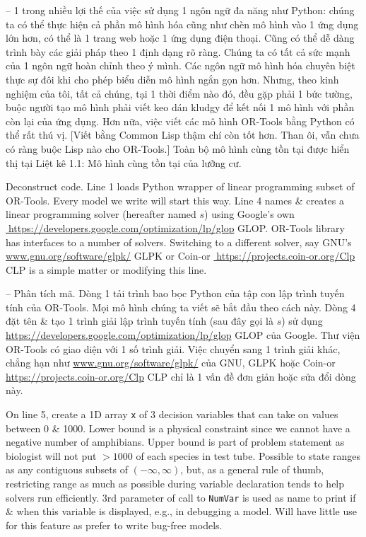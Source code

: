 \documentclass{article}
\begin{document}
\begin{itemize}
\begin{itemize}
        -- 1 trong nhiều lợi thế của việc sử dụng 1 ngôn ngữ đa năng như Python: chúng ta có thể thực hiện cả phần mô hình hóa cũng như chèn mô hình vào 1 ứng dụng lớn hơn, có thể là 1 trang web hoặc 1 ứng dụng điện thoại. Cũng có thể dễ dàng trình bày các giải pháp theo 1 định dạng rõ ràng. Chúng ta có tất cả sức mạnh của 1 ngôn ngữ hoàn chỉnh theo ý mình. Các ngôn ngữ mô hình hóa chuyên biệt thực sự đôi khi cho phép biểu diễn mô hình ngắn gọn hơn. Nhưng, theo kinh nghiệm của tôi, tất cả chúng, tại 1 thời điểm nào đó, đều gặp phải 1 bức tường, buộc người tạo mô hình phải viết keo dán kludgy để kết nối 1 mô hình với phần còn lại của ứng dụng. Hơn nữa, việc viết các mô hình OR-Tools bằng Python có thể rất thú vị. [Viết bằng Common Lisp thậm chí còn tốt hơn. Than ôi, vẫn chưa có ràng buộc Lisp nào cho OR-Tools.] Toàn bộ mô hình cùng tồn tại được hiển thị tại {\sf Liệt kê 1.1: Mô hình cùng tồn tại của lưỡng cư}.

        Deconstruct code. Line 1 loads Python wrapper of linear programming subset of OR-Tools. Every model we write will start this way. Line 4 names \& creates a linear programming solver (hereafter named $s$) using Google's own \url{https://developers.google.com/optimization/lp/glop} GLOP. OR-Tools library has interfaces to a number of solvers. Switching to a different solver, say GNU's \url{www.gnu.org/software/glpk/} GLPK or Coin-or \url{https://projects.coin-or.org/Clp} CLP is a simple matter or modifying this line.

        -- Phân tích mã. Dòng 1 tải trình bao bọc Python của tập con lập trình tuyến tính của OR-Tools. Mọi mô hình chúng ta viết sẽ bắt đầu theo cách này. Dòng 4 đặt tên \& tạo 1 trình giải lập trình tuyến tính (sau đây gọi là $s$) sử dụng \url{ https://developers.google.com/optimization/lp/glop} GLOP của Google. Thư viện OR-Tools có giao diện với 1 số trình giải. Việc chuyển sang 1 trình giải khác, chẳng hạn như \url{www.gnu.org/software/glpk/} của GNU, GLPK hoặc Coin-or \url{ https://projects.coin-or.org/Clp} CLP chỉ là 1 vấn đề đơn giản hoặc sửa đổi dòng này.

        On line 5, create a 1D array {\tt x} of 3 decision variables that can take on values between 0 \& 1000. Lower bound is a physical constraint since we cannot have a negative number of amphibians. Upper bound is part of problem statement as biologist will not put $> 1000$ of each species in test tube. Possible to state ranges as any contiguous subsets of $(-\infty,\infty)$, but, as a general rule of thumb, restricting range as much as possible during variable declaration tends to help solvers run efficiently. 3rd parameter of call to {\tt NumVar} is used as name to print if \& when this variable is displayed, e.g., in debugging a model. Will have little use for this feature as prefer to write bug-free models.


\end{itemize}
\end{itemize}
\end{document}
